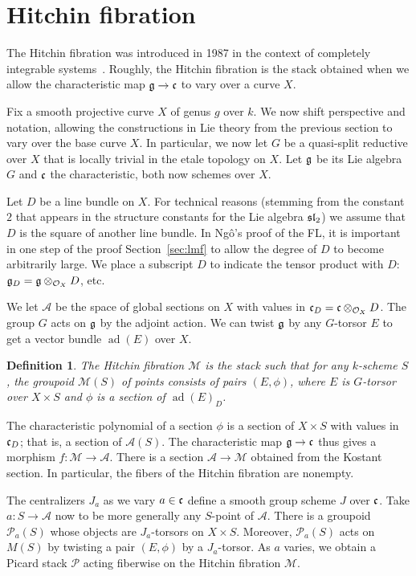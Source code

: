 \documentclass[brochure,english,12pt]{bourbaki}
\newtheorem{definition}[equation]{Definition}
\def\op#1{{\operatorname{#1}}}
\def\sl{\frak{sl}}
\def\g{\frak{g}}
\def\cc{\frak{c}}
\def\A{{\mathcal A}}
\def\M{{\mathcal M}}
\def\P{{\mathcal P}}
\def\O{{\mathcal O}}
\begin{document}
\section{Hitchin fibration}

The Hitchin fibration was introduced in 1987 in the context of
completely integrable systems~\cite{Hitchin:87}.  Roughly, the Hitchin
fibration is the stack obtained when we allow the characteristic map
$\g\to\cc$ to vary over a curve $X$.

Fix a smooth projective curve $X$ of genus $g$ over $k$.  We now shift
perspective and notation, allowing the constructions in Lie theory
from the previous section to vary over the base curve $X$.  In
particular, we now let $G$ be a quasi-split reductive over $X$ that is
locally trivial in the etale topology on $X$.  Let $\g$ be its Lie
algebra $G$ and $\cc$ the characteristic, both now schemes over $X$.

Let $D$ be a line bundle on $X$. For technical reasons (stemming from
the constant $2$ that appears in the structure constants for the Lie
algebra $\sl_2$) we assume that $D$ is the square of another line
bundle.  In Ng\^o's proof of the FL, it is important in one step of
the proof Section~\ref{sec:lmf} to allow the degree of $D$ to become
arbitrarily large.  We place a subscript $D$ to indicate the tensor
product with $D$: $\g_D = \g\otimes_{\O_X} D$, etc.

We let $\A$ be the space of global sections on $X$ with values in
$\cc_D=\cc\otimes_{\O_X} D$.  The group $G$ acts on $\g$ by the
adjoint action.  We can twist $\g$ by any $G$-torsor $E$ to get a
vector bundle $\op{ad}(E)$ over $X$.

\begin{definition}
The Hitchin fibration $\M$ is the stack
such that for any $k$-scheme $S$, the groupoid $\M(S)$ of points consists
of pairs $(E,\phi)$, where $E$ is $G$-torsor over $X\times S$ and $\phi$ is a section of
$\op{ad}(E)_D$.
\end{definition}

The characteristic polynomial of a section $\phi$ is a section of
$X\times S$ with values in $\cc_D$; that is, a section of $\A(S)$.
The characteristic map $\g\to\cc$ thus gives a morphism $f:\M\to\A$.
There is a section $\A\to\M$ obtained from the Kostant section.  In
particular, the fibers of the Hitchin fibration are nonempty.

The centralizers $J_a$ as we vary $a\in \cc$ define a smooth group
scheme $J$ over $\cc$.  Take $a:S\to\A$ now to be more generally any
$S$-point of $\A$.  There is a groupoid $\P_a(S)$ whose objects are
$J_a$-torsors on $X\times S$.  Moreover, $\P_a(S)$ acts on $M(S)$ by
twisting a pair $(E,\phi)$ by a $J_a$-torsor.  As $a$ varies, we
obtain a Picard stack $\P$ acting fiberwise on the Hitchin fibration
$\M$.
\end{document}
